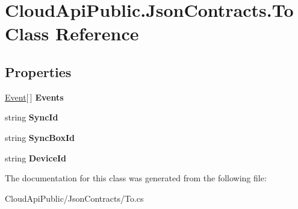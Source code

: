 \hypertarget{class_cloud_api_public_1_1_json_contracts_1_1_to}{\section{Cloud\-Api\-Public.\-Json\-Contracts.\-To Class Reference}
\label{class_cloud_api_public_1_1_json_contracts_1_1_to}
}
\subsection*{Properties}
\begin{DoxyCompactItemize}
\item 
\hypertarget{class_cloud_api_public_1_1_json_contracts_1_1_to_af2729d9981675b110e04d197bb77f254}{\hyperlink{class_cloud_api_public_1_1_json_contracts_1_1_event}{Event}\mbox{[}$\,$\mbox{]} {\bfseries Events}}\label{class_cloud_api_public_1_1_json_contracts_1_1_to_af2729d9981675b110e04d197bb77f254}

\item 
\hypertarget{class_cloud_api_public_1_1_json_contracts_1_1_to_ab43b77ef4182abf87589fdb30ba0bd6a}{string {\bfseries Sync\-Id}}\label{class_cloud_api_public_1_1_json_contracts_1_1_to_ab43b77ef4182abf87589fdb30ba0bd6a}

\item 
\hypertarget{class_cloud_api_public_1_1_json_contracts_1_1_to_a20eebaf6be25abc6d574db1fc75bf771}{string {\bfseries Sync\-Box\-Id}}\label{class_cloud_api_public_1_1_json_contracts_1_1_to_a20eebaf6be25abc6d574db1fc75bf771}

\item 
\hypertarget{class_cloud_api_public_1_1_json_contracts_1_1_to_a3ad0e53c6ba80f8be0c6e2384855a77e}{string {\bfseries Device\-Id}}\label{class_cloud_api_public_1_1_json_contracts_1_1_to_a3ad0e53c6ba80f8be0c6e2384855a77e}

\end{DoxyCompactItemize}


The documentation for this class was generated from the following file\-:\begin{DoxyCompactItemize}
\item 
Cloud\-Api\-Public/\-Json\-Contracts/To.\-cs\end{DoxyCompactItemize}
